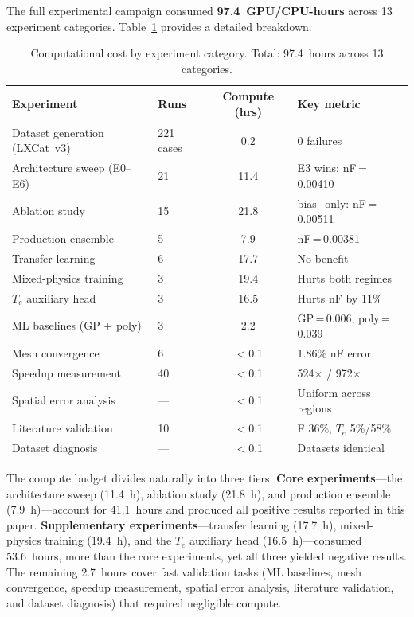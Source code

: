\documentclass[12pt,a4paper]{article}
\begin{document}
The full experimental campaign consumed \textbf{97.4~GPU/CPU-hours}
across 13 experiment categories.
Table~\ref{tab:compute} provides a detailed breakdown.

\begin{table}[H]
  \centering
  \caption{Computational cost by experiment category.  Total:
           97.4~hours across 13 categories.}
  \label{tab:compute}
  \small
  \begin{tabular}{@{}llcl@{}}
    \toprule
    Experiment & Runs & Compute (hrs) & Key metric \\
    \midrule
    Dataset generation (LXCat~v3) & 221 cases & 0.2
      & 0 failures \\
    Architecture sweep (E0--E6) & 21 & 11.4
      & E3 wins: nF\,=\,0.00410 \\
    Ablation study & 15 & 21.8
      & bias\_only: nF\,=\,0.00511 \\
    Production ensemble & 5 & 7.9
      & nF\,=\,0.00381 \\
    Transfer learning & 6 & 17.7
      & No benefit \\
    Mixed-physics training & 3 & 19.4
      & Hurts both regimes \\
    $T_e$ auxiliary head & 3 & 16.5
      & Hurts nF by 11\% \\
    ML baselines (GP + poly) & 3 & 2.2
      & GP\,=\,0.006, poly\,=\,0.039 \\
    Mesh convergence & 6 & $<$0.1
      & 1.86\% nF error \\
    Speedup measurement & 40 & $<$0.1
      & 524$\times$ / 972$\times$ \\
    Spatial error analysis & --- & $<$0.1
      & Uniform across regions \\
    Literature validation & 10 & $<$0.1
      & F 36\%, $T_e$ 5\%/58\% \\
    Dataset diagnosis & --- & $<$0.1
      & Datasets identical \\
    \bottomrule
  \end{tabular}
\end{table}

The compute budget divides naturally into three tiers.
\textbf{Core experiments}---the architecture sweep (11.4~h),
ablation study (21.8~h), and production ensemble (7.9~h)---account
for 41.1~hours and produced all positive results reported in this
paper.  \textbf{Supplementary experiments}---transfer learning
(17.7~h), mixed-physics training (19.4~h), and the $T_e$ auxiliary
head (16.5~h)---consumed 53.6~hours, more than the core experiments,
yet all three yielded negative results.  The remaining 2.7~hours
cover fast validation tasks (ML baselines, mesh convergence, speedup
measurement, spatial error analysis, literature validation, and
dataset diagnosis) that required negligible compute.
\end{document}
